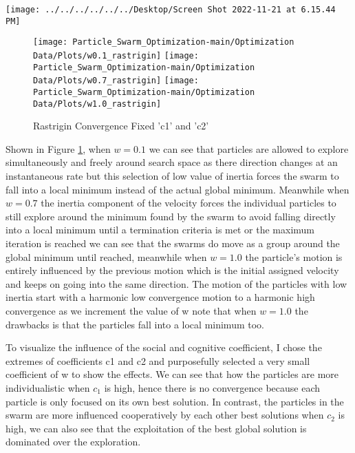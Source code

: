 \documentclass[
]{article}
\begin{document}
\begin{center}\texttt{[image: ../../../../../../Desktop/Screen Shot 2022-11-21 at 6.15.44 PM]} \end{center}

\begin{figure}[H]

{\centering \texttt{[image: Particle\_Swarm\_Optimization-main/Optimization Data/Plots/w0.1\_rastrigin]} \texttt{[image: Particle\_Swarm\_Optimization-main/Optimization Data/Plots/w0.7\_rastrigin]} \texttt{[image: Particle\_Swarm\_Optimization-main/Optimization Data/Plots/w1.0\_rastrigin]} 

}

\caption{Rastrigin Convergence Fixed 'c1' and 'c2' \label{fig:rastriginconvergencefc1c2}}\label{fig:rastriginconvergencefc1c2}
\end{figure}

Shown in Figure \ref{fig:rastriginconvergencefc1c2}, when \(w=0.1\) we
can see that particles are allowed to explore simultaneously and freely
around search space as there direction changes at an instantaneous rate
but this selection of low value of inertia forces the swarm to fall into
a local minimum instead of the actual global minimum. Meanwhile when
\(w=0.7\) the inertia component of the velocity forces the individual
particles to still explore around the minimum found by the swarm to
avoid falling directly into a local minimum until a termination criteria
is met or the maximum iteration is reached we can see that the swarms do
move as a group around the global minimum until reached, meanwhile when
\(w=1.0\) the particle's motion is entirely influenced by the previous
motion which is the initial assigned velocity and keeps on going into
the same direction. The motion of the particles with low inertia start
with a harmonic low convergence motion to a harmonic high convergence as
we increment the value of w note that when \(w=1.0\) the drawbacks is
that the particles fall into a local minimum too.

\newpage

To visualize the influence of the social and cognitive coefficient, I
chose the extremes of coefficients c1 and c2 and purposefully selected a
very small coefficient of w to show the effects. We can see that how the
particles are more individualistic when \(c_1\) is high, hence there is
no convergence because each particle is only focused on its own best
solution. In contrast, the particles in the swarm are more influenced
cooperatively by each other best solutions when \(c_2\) is high, we can
also see that the exploitation of the best global solution is dominated
over the exploration.
\end{document}
